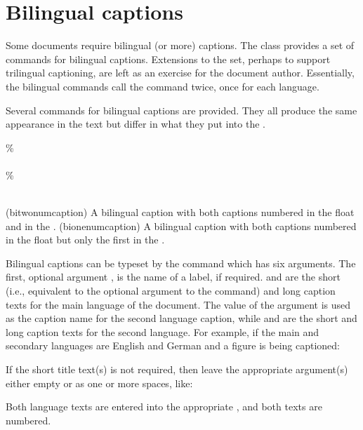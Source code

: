 

 \section{Bilingual captions}


    Some documents require bilingual (or more) captions. The class 
 provides a set of commands for bilingual captions. Extensions to the
 set, perhaps to support trilingual captioning, are left as an exercise
 for the document author.
Essentially, the bilingual commands call the \cmd{\caption}
command twice, once for each language.

    Several commands for bilingual captions are provided. They all produce
the same appearance in the text but differ in what they put into 
the \listofx. 

\begin{syntax}
\cmd{\bitwonumcaption}\% \\
                       \\
\cmd{\bionenumcaption}\% \\
                       \\
\end{syntax}
\glossary(bitwonumcaption)%
  {}%
  {A bilingual caption with both captions numbered in the float and in the \listofx.}
\glossary(bionenumcaption)%
  {}%
  {A bilingual caption with both captions numbered in the float but only the first in the \listofx.}

  Bilingual captions can be typeset by the \cmd{\bitwonumcaption} 
 command which has six arguments. 
 The first, optional argument , is the name of a label, if
 required.
  and  are the short (i.e., equivalent
 to the optional argument
 to the \cmd{\caption} command) and long caption texts for
 the main language of the document. The value of the  argument
 is used as the caption name for the second language caption, while
  and  are the short and long caption texts
 for the second language. For example, if the main and secondary languages
 are English and German and a figure is being captioned:
\begin{lcode}
\end{lcode}
If the short title text(s) is not required, then leave the appropriate
argument(s) either empty or as one or more spaces, like:
\begin{lcode}
\end{lcode}
Both language texts are entered into the 
appropriate \listofx,
and both texts are numbered.

